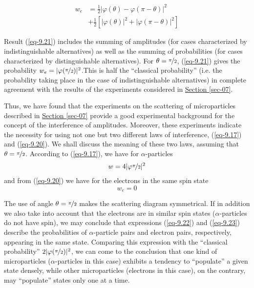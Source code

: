 \documentclass[a4paper,sfsidenotes,colorlinks=true]{tufte-book}
\numberwithin{equation}{section}
\numberwithin{figure}{section}
\begin{document}
\begin{equation}%
\begin{split}
w_{e} &= \frac{1}{2} |\varphi (\theta) - \varphi (\pi - \theta) |^{2}\\
& + \frac{1}{2} \left[ |\varphi(\theta)|^{2}+ |\varphi (\pi - \theta)|^{2} \right]
\end{split}
\label{eq-9.21}
\end{equation}

Result (\ref{eq-9.21}) includes the summing of amplitudes (for cases
characterized by indistinguishable alternatives) as well as the
summing of probabilities (for cases characterized by distinguishable
alternatives). For $\theta = \nicefrac{\pi}{2}$, (\ref{eq-9.21}) gives
the probability $w_{e} = |\varphi (\nicefrac{\pi}{2})|^{2}$.This is half the ``classical probability'' (i.e. the probability taking place in the case of indistinguishable alternatives) in complete agreement with the results of the experiments considered in \hyperref[sec-07]{Section \ref{sec-07}}.


Thus, we have found that the
experiments on the scattering of microparticles described in
\hyperref[sec-07]{Section \ref{sec-07}} provide a good experimental
background for the concept of the interference of
amplitudes. Moreover, these experiments indicate the necessity for
using not one but two different laws of interference, (\ref{eq-9.17}) and
(\ref{eq-9.20}). We shall discuss the meaning of these two laws, assuming that
$\theta = \nicefrac{\pi}{2}$. According to (\ref{eq-9.17}), we have for $\alpha$-particles
\begin{equation}%
w = 4 | \varphi  \nicefrac{\pi}{2} |^{2}	
\label{eq-9.22}
\end{equation}
and from (\ref{eq-9.20}) we have for the electrons in the same spin state
\begin{equation}%
w_{e} = 0
\label{eq-9.23}
\end{equation}

The use of angle $\theta = \nicefrac{\pi}{2}$ makes the scattering
diagram symmetrical. If in addition we also take into account that the
electrons are in similar spin states ($\alpha$-particles do not have
spin), we may conclude that expressions (\ref{eq-9.22}) and
(\ref{eq-9.23}) describe the probabilities of $\alpha$-particle pairs
and electron pairs, respectively, appearing in the same
state. Comparing this expression with the ``classical probability'' $2
| \varphi (\nicefrac{\pi}{2})|^{2}$, we can come to the conclusion
that one kind of microparticles ($\alpha$-particles in this case)
exhibits a tendency to ``populate'' a given state densely, while other microparticles (electrons in this case), on the contrary, may ``populate'' states only one at a time.
\end{document}
